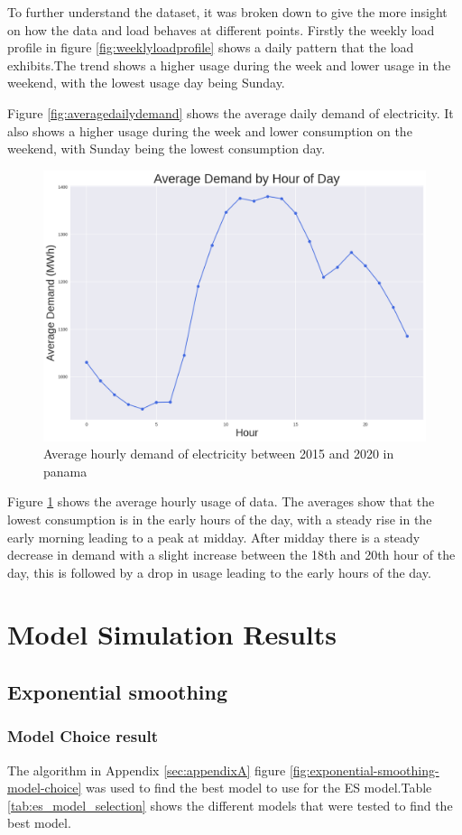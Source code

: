   
  To further understand the dataset, it was broken down to give the more insight on how the data and load behaves at different points. Firstly the weekly load profile in figure \ref{fig:weeklyloadprofile} shows a daily pattern that the load exhibits.The trend shows a higher usage during the week and lower usage in the weekend, with the lowest usage day being Sunday. 
  
  
  Figure \ref{fig:averagedailydemand} shows the average daily demand  of electricity. It also shows a higher usage during the week and lower consumption on the weekend, with Sunday being the lowest consumption day. 
  \begin{figure}[h]
  	\centering
  	\includegraphics[width=0.45\linewidth]{Chapters/images/results/average_hourly_demand}
  	\caption{Average hourly demand of electricity between 2015 and 2020 in panama}
  	\label{fig:averagehourlydemand}
  \end{figure}
  
  Figure \ref{fig:averagehourlydemand} shows the average hourly usage of data. The averages show that the lowest consumption is in the early hours of the day, with a steady rise in the early morning leading to a peak at midday. After midday there is a steady decrease in demand with a slight increase between the 18th and 20th hour of the day, this is followed by a drop in usage leading to the early hours of the day.  


\section{Model Simulation Results}

\subsection{Exponential smoothing}
\subsubsection{Model Choice result}
The algorithm in  Appendix \ref{sec:appendixA} figure \ref{fig:exponential-smoothing-model-choice} was used to find the best model to use for the ES model.Table \ref{tab:es_model_selection} shows the different models that were tested to find the best model.

